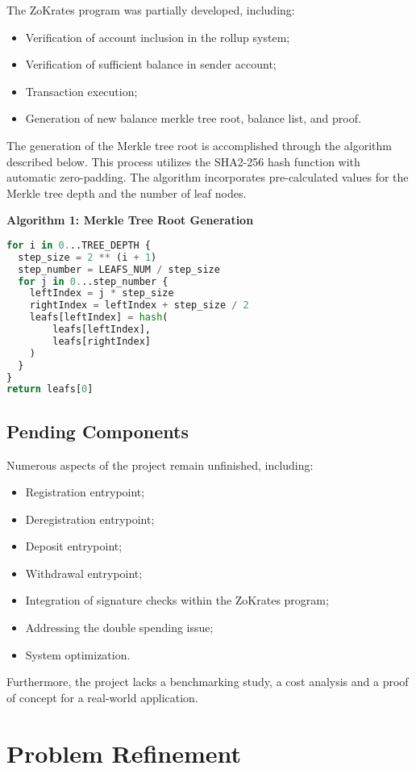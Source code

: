 The ZoKrates program was partially developed, including:
\begin{itemize}
    \item Verification of account inclusion in the rollup system;
    \item Verification of sufficient balance in sender account;
    \item Transaction execution;
    \item Generation of new balance merkle tree root, balance list, and proof.
\end{itemize}

The generation of the Merkle tree root is accomplished through the algorithm described below. This process utilizes the SHA2-256 hash function with automatic zero-padding. The algorithm incorporates pre-calculated values for the Merkle tree depth and the number of leaf nodes.

\noindent\textbf{Algorithm 1: Merkle Tree Root Generation}
\begin{lstlisting}[language=Python]
for i in 0...TREE_DEPTH {
  step_size = 2 ** (i + 1)
  step_number = LEAFS_NUM / step_size
  for j in 0...step_number {
    leftIndex = j * step_size
    rightIndex = leftIndex + step_size / 2
    leafs[leftIndex] = hash(
        leafs[leftIndex],
        leafs[rightIndex]
    )
  }
}
return leafs[0]
\end{lstlisting}

\subsection{Pending Components\label{subsec:pendingcomponents}}
Numerous aspects of the project remain unfinished, including:
\begin{itemize}
  \item Registration entrypoint;
  \item Deregistration entrypoint;
  \item Deposit entrypoint;
  \item Withdrawal entrypoint;
  \item Integration of signature checks within the ZoKrates program;
  \item Addressing the double spending issue;
  \item System optimization.
\end{itemize}
Furthermore, the project lacks a benchmarking study, a cost analysis and a proof of concept for a real-world application.

\section{Problem Refinement}

